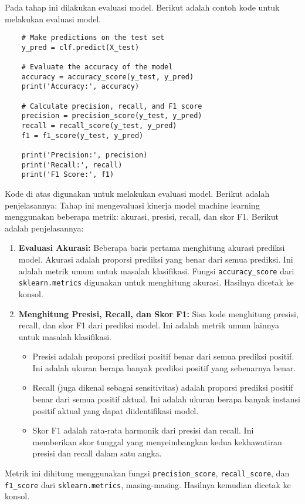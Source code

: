 Pada tahap ini dilakukan evaluasi model. Berikut adalah contoh kode untuk melakukan evaluasi model.
\begin{lstlisting}
    # Make predictions on the test set
    y_pred = clf.predict(X_test)
    
    # Evaluate the accuracy of the model
    accuracy = accuracy_score(y_test, y_pred)
    print('Accuracy:', accuracy)
    
    # Calculate precision, recall, and F1 score
    precision = precision_score(y_test, y_pred)
    recall = recall_score(y_test, y_pred)
    f1 = f1_score(y_test, y_pred)
    
    print('Precision:', precision)
    print('Recall:', recall)
    print('F1 Score:', f1)
\end{lstlisting}

Kode di atas digunakan untuk melakukan evaluasi model. Berikut adalah penjelasannya:
Tahap ini mengevaluasi kinerja model machine learning menggunakan beberapa metrik: akurasi, presisi, recall, dan skor F1. Berikut adalah penjelasannya:

\begin{enumerate}
\item \textbf{Evaluasi Akurasi:} Beberapa baris pertama menghitung akurasi prediksi model. Akurasi adalah proporsi prediksi yang benar dari semua prediksi. Ini adalah metrik umum untuk masalah klasifikasi. Fungsi \texttt{accuracy\_score} dari \texttt{sklearn.metrics} digunakan untuk menghitung akurasi. Hasilnya dicetak ke konsol.
\item \textbf{Menghitung Presisi, Recall, dan Skor F1:} Sisa kode menghitung presisi, recall, dan skor F1 dari prediksi model. Ini adalah metrik umum lainnya untuk masalah klasifikasi.
   \begin{itemize}
   \item Presisi adalah proporsi prediksi positif benar dari semua prediksi positif. Ini adalah ukuran berapa banyak prediksi positif yang sebenarnya benar.
   \item Recall (juga dikenal sebagai sensitivitas) adalah proporsi prediksi positif benar dari semua positif aktual. Ini adalah ukuran berapa banyak instansi positif aktual yang dapat diidentifikasi model.
   \item Skor F1 adalah rata-rata harmonik dari presisi dan recall. Ini memberikan skor tunggal yang menyeimbangkan kedua kekhawatiran presisi dan recall dalam satu angka.
   \end{itemize}
\end{enumerate}

Metrik ini dihitung menggunakan fungsi \texttt{precision\_score}, \texttt{recall\_score}, dan \texttt{f1\_score} dari \texttt{sklearn.metrics}, masing-masing. Hasilnya kemudian dicetak ke konsol.
